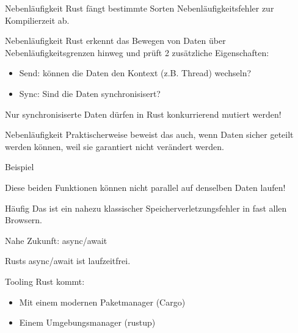 \documentclass{beamer}
\begin{document}
\begin{frame}{Nebenläufigkeit}
	Rust fängt bestimmte Sorten Nebenläufigkeitsfehler zur Kompilierzeit ab.

\end{frame}

\begin{frame}{Nebenläufigkeit}
	Rust erkennt das Bewegen von Daten über Nebenläufigkeitsgrenzen hinweg und prüft 2 zusätzliche Eigenschaften:

	\begin{itemize}
		\item Send: können die Daten den Kontext (z.B. Thread) wechseln?
		\item Sync: Sind die Daten synchronisisert?
	\end{itemize}

	Nur synchronisiserte Daten dürfen in Rust konkurrierend mutiert werden!
\end{frame}

\begin{frame}{Nebenläufigkeit}
	Praktischerweise beweist das auch, wenn Daten sicher geteilt werden können, weil sie garantiert nicht verändert werden.
\end{frame}

\begin{frame}{Beispiel}

	Diese beiden Funktionen können nicht parallel auf denselben Daten laufen!
\end{frame}


\begin{frame}{Häufig}
   Das ist ein nahezu klassischer Speicherverletzungsfehler in fast allen Browsern.
\end{frame}

\begin{frame}{Nahe Zukunft: async/await}

  Rusts async/await ist laufzeitfrei.
\end{frame}

\begin{frame}{Tooling}
	Rust kommt:

	\begin{itemize}
		\item Mit einem modernen Paketmanager (Cargo)
		\item Einem Umgebungsmanager (rustup)
	\end{itemize}
\end{frame}
\end{document}
